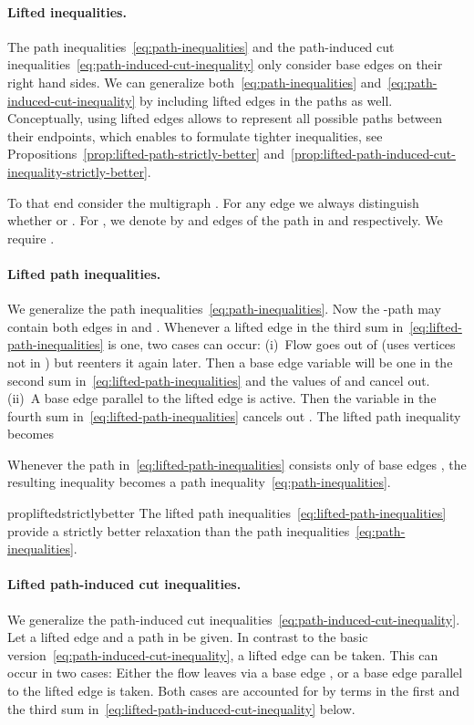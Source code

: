 \documentclass{article}
\begin{document}
\paragraph{Lifted inequalities.}
The path inequalities~\eqref{eq:path-inequalities} and the path-induced cut inequalities~\eqref{eq:path-induced-cut-inequality} only consider base edges on their right hand sides.
We can generalize both~\eqref{eq:path-inequalities} and~\eqref{eq:path-induced-cut-inequality} by including lifted edges in the paths as well.
Conceptually, using lifted edges allows to represent all possible paths between their endpoints, which enables to formulate tighter inequalities, see Propositions~\ref{prop:lifted-path-strictly-better} and~\ref{prop:lifted-path-induced-cut-inequality-strictly-better}.




To that end consider the multigraph .
For any edge  we always distinguish whether  or .
For , we denote by  and  edges of the path  in  and  respectively. 
We require . 


\paragraph{Lifted path inequalities.}
We generalize the path inequalities~\eqref{eq:path-inequalities}.
Now the -path  may contain both edges in  and .
Whenever a lifted edge  in the third sum in~\eqref{eq:lifted-path-inequalities} is one, two cases can occur:
(i)~Flow goes out of  (uses vertices not in ) but reenters it again later.
Then a base edge variable  will be one in the second sum in~\eqref{eq:lifted-path-inequalities} and the values of  and  cancel out.
(ii)~A base edge  parallel to the lifted edge is active.
Then the variable  in the fourth sum in~\eqref{eq:lifted-path-inequalities} cancels out .
The lifted path inequality becomes

Whenever the path in~\eqref{eq:lifted-path-inequalities} consists only of base edges , the resulting inequality becomes a path inequality~\eqref{eq:path-inequalities}.

\begin{restatable}{prop}{liftedstrictlybetter}
\label{prop:lifted-path-strictly-better}
The lifted path inequalities~\eqref{eq:lifted-path-inequalities} provide a strictly better relaxation than the path inequalities~\eqref{eq:path-inequalities}.
\end{restatable}



\paragraph{Lifted path-induced cut inequalities.}
We generalize the path-induced cut inequalities~\eqref{eq:path-induced-cut-inequality}.
Let a lifted edge  and a path  in  be given.
In contrast to the basic version~\eqref{eq:path-induced-cut-inequality}, a lifted edge  can be taken.
This can occur in two cases: Either the flow leaves  via a base edge ,  or a base edge  parallel to the lifted edge is taken. Both cases are accounted for by terms in the first and the third sum in~\eqref{eq:lifted-path-induced-cut-inequality} below.
\end{document}
